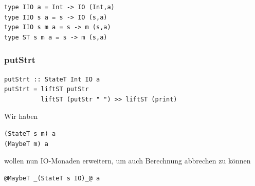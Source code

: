 			\lstHaskell
			\begin{lstlisting}
type IIO a = Int -> IO (Int,a)
type IIO s a = s -> IO (s,a)
type IIO s m a = s -> m (s,a)
type ST s m a = s -> m (s,a)
			\end{lstlisting}


		\subsubsection{putStrt} %
		\label{ssub:putstrt}
		
			\lstHaskell
			\begin{lstlisting}
putStrt :: StateT Int IO a
putStrt = liftST putStr
          liftST (putStr " ") >> liftST (print)
			\end{lstlisting}





	Wir haben

	\lstHaskell
	\begin{lstlisting}
(StateT s m) a
(MaybeT m) a
	\end{lstlisting}

	wollen nun IO-Monaden erweitern, um auch Berechnung abbrechen zu können

	\lstHaskell
	\begin{lstlisting}
@MaybeT _(StateT s IO)_@ a
	\end{lstlisting}